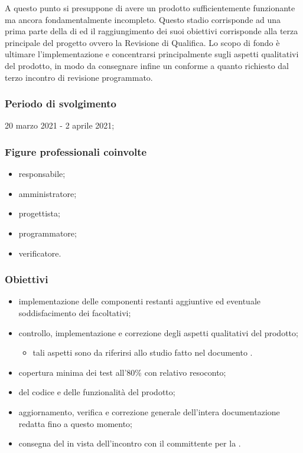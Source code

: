 A questo punto si presuppone di avere un prodotto sufficientemente funzionante ma ancora fondamentalmente incompleto. Questo stadio corrisponde ad una prima parte della  di  ed il raggiungimento dei suoi obiettivi corrisponde alla terza  principale del progetto ovvero la Revisione di Qualifica. Lo scopo di fondo è ultimare l'implementazione e concentrarsi principalmente sugli aspetti qualitativi del prodotto, in modo da consegnare infine un  conforme a quanto richiesto dal terzo incontro di revisione programmato.
        
        \subsubsection{Periodo di svolgimento}
        20 marzo 2021 - 2 aprile 2021;
        
        \subsubsection{Figure professionali coinvolte}
            \begin{itemize}
                \item responsabile;
                \item amministratore;
                \item progettista;
                \item programmatore;
                \item verificatore.
            \end{itemize}

        \subsubsection{Obiettivi}
        \begin{itemize}
            \item implementazione delle componenti restanti aggiuntive ed eventuale soddisfacimento dei  facoltativi;
            \item controllo, implementazione e correzione degli aspetti qualitativi del prodotto;
            \begin{itemize}
                \item tali aspetti sono da riferirsi allo studio fatto nel documento \PdQ{}. %
            \end{itemize}
            \item copertura minima dei test all'80\% con relativo resoconto;
            \item {} del codice e delle funzionalità del prodotto;
            \item aggiornamento, verifica e correzione generale dell'intera documentazione redatta fino a questo momento;
            \item consegna del  in vista dell'incontro con il committente per la \RQ{}.
        \end{itemize}